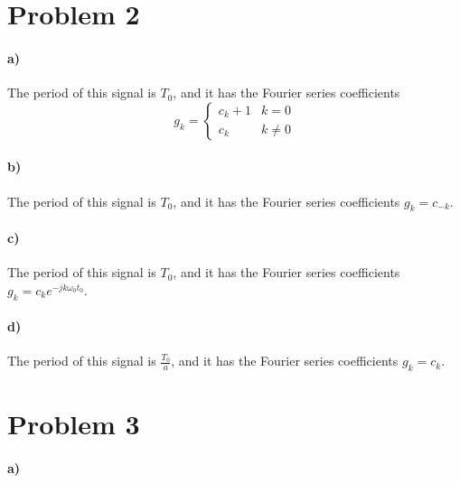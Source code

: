 \documentclass[12pt]{article}
\begin{document}
\section*{Problem 2}

\paragraph{a)}

The period of this signal is \(T_0\), and it has the Fourier series coefficients
\[g_k=
    \begin{cases}
        c_k+1 & k=0\\
        c_k & k\neq 0
    \end{cases}
\]

\paragraph{b)}

The period of this signal is \(T_0\), and it has the Fourier series coefficients \(g_k=c_{-k}\).

\paragraph{c)}

The period of this signal is \(T_0\), and it has the Fourier series coefficients \(g_k=c_ke^{-jk\omega_0 t_0}\).

\paragraph{d)}

The period of this signal is \(\frac{T_0}{a}\), and it has the Fourier series coefficients \(g_k=c_k\).

\section*{Problem 3}

\paragraph{a)}
\end{document}
